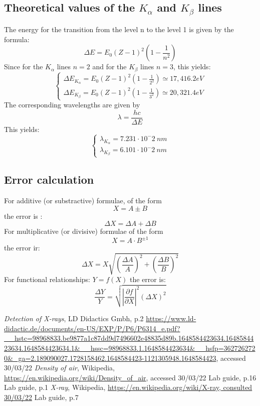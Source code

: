 \documentclass{scrartcl}
\begin{document}
\subsection{Theoretical values of the $K_{\alpha}$ and $K_{\beta}$ lines}
The energy for the transition from the level n to the level 1 is given by the formula:
\[ \Delta E = E_0(Z-1)^2\left(1-\frac{1}{n^2}\right) \]
Since for the $K_\alpha$ lines $n=2$ and for the $K_\beta$ lines $n=3$, this yields: \[\begin{cases}
    \Delta E_{K_\alpha} = E_0(Z-1)^2\left(1-\frac{1}{2^2}\right) \simeq 17,416.2 eV\\
    \Delta E_{K_\beta} = E_0(Z-1)^2\left(1-\frac{1}{3^2}\right) \simeq 20,321.4 eV 
\end{cases}\]
The corresponding wavelengths are given by \[ \lambda = \frac{hc}{\Delta E}\]
This yields:
\[\begin{cases}
    \lambda_{K_\alpha} = 7.231 \cdot 10^-2 \ nm \\
    \lambda_{K_\beta} = 6.101 \cdot 10^-2 \ nm
\end{cases}
\]
\subsection{Error calculation}
For additive (or substractive) formulae, of the form \[ X = A \pm B\] the error is : \[\Delta X = \Delta A + \Delta B\]
For multiplicative (or divisive) formulae of the form \[X = A \cdot  B^{\pm 1}\] the error ir: \[  \Delta X = X\sqrt{\left(\frac{\Delta A}{A}\right)^2+\left(\frac{\Delta B}{B}\right)^2} \]
For functional relationships: $Y=f(X)$ the error is: \[ \frac{\Delta Y}{Y} = \sqrt{\left|\frac{\partial f}{\partial X}\right|^2(\Delta X)^2} \] 

\begin{thebibliography}{!}
     \textit{Detection of X-rays}, LD Didactics Gmbh, p.2 \url{https://www.ld-didactic.de/documents/en-US/EXP/P/P6/P6314_e.pdf?__hstc=98968833.be9877a1c87dd9d7496602e48835d89b.1648584423634.1648584423634.1648584423634.1&__hssc=98968833.1.1648584423634&__hsfp=3627262720&_ga=2.189090027.1728158462.1648584423-1121305948.1648584423}, accessed 30/03/22
     \textit{Density of air}, Wikipedia, \url{https://en.wikipedia.org/wiki/Density_of_air}, accessed 30/03/22
     Lab guide, p.16
     Lab guide, p.1
     \textit{X-ray}, Wikipedia, \url{https://en.wikipedia.org/wiki/X-ray, consulted 30/03/22}
     Lab guide, p.7
\end{thebibliography}
\end{document}
